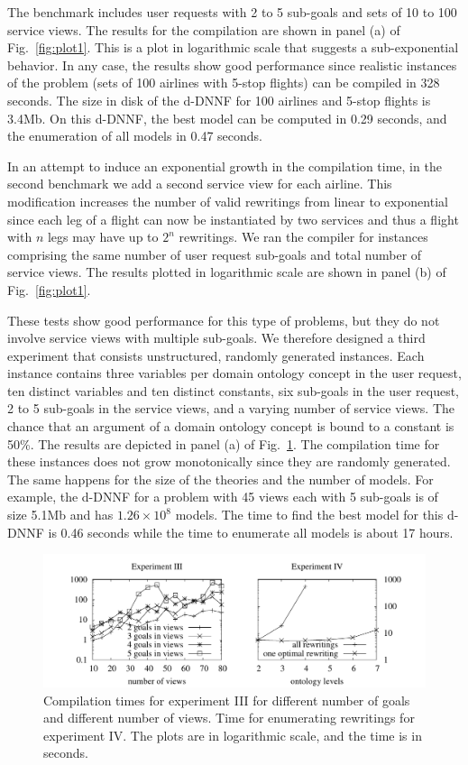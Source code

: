 \documentclass{llncs}
\begin{document}
The benchmark includes user requests with 2 to 5 sub-goals and
sets of 10 to 100 service views. The results for the compilation are
shown in panel (a) of Fig.~\ref{fig:plot1}. This is a plot in logarithmic
scale that suggests a sub-exponential behavior. In any case, the results
show good performance since realistic instances of the problem (sets of 100
airlines with 5-stop flights) can be compiled in 328 seconds.
The size in disk of the d-DNNF for 100 airlines and 5-stop flights is 3.4Mb.
On this d-DNNF, the best model can be computed in 0.29 seconds,
and the enumeration of all models in 0.47 seconds.

In an attempt to induce an exponential growth in the compilation time,
in the second benchmark we add a second service view for each airline.
This modification increases the number of valid rewritings from linear
to exponential since each leg of a flight can now be instantiated by two
services and thus a flight with $n$ legs may have up to $2^n$
rewritings.
We ran the compiler for instances comprising the same number of user request
sub-goals and total number of service views. The results plotted in
logarithmic scale are shown in panel (b) of Fig.~\ref{fig:plot1}.

These tests show good performance for this type of problems, but they do not
involve service views with multiple sub-goals. We therefore designed a
third experiment that consists unstructured, randomly generated instances.
Each instance contains three variables per domain ontology concept in the user request, ten distinct
variables and ten distinct constants, six sub-goals in the user request,
2 to 5 sub-goals in the service views, and a varying number of service views.
The chance that an argument of a domain ontology concept is bound to a constant is 50\%.
The results are depicted  in panel (a) of Fig.~\ref{fig:plot4}.
The compilation time for these instances does not grow monotonically
since they are randomly generated. The same happens for the size of
the theories and the number of models. For example, the d-DNNF for 
a problem with 45 views each with 5 sub-goals is of size 5.1Mb and has
$1.26\times 10^8$ models. The time to find the best model for
this d-DNNF is 0.46 seconds while the time to enumerate all models
is about 17 hours.

\begin{figure}[t]
\centering
\includegraphics[width=.9\textwidth]{plots/plot4}
\caption{Compilation times for experiment III for different number of goals
and different number of views. Time for enumerating rewritings for experiment IV. The plots are in logarithmic scale, and the time
is in seconds. }
\label{fig:plot4}
\end{figure}
\end{document}
